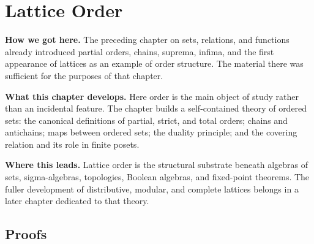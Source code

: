 \chapter{Lattice Order}


\begin{tcolorbox}[
  colback=gray!6,
  colframe=gray!40,
  arc=2pt,
  left=8pt, right=8pt, top=6pt, bottom=6pt,
  title={\small\textbf{Structural Roadmap}},
  fonttitle=\small\bfseries
]
\noindent\textbf{How we got here.}
The preceding chapter on sets, relations, and functions already introduced
partial orders, chains, suprema, infima, and the first appearance of
lattices as an example of order structure.  The material there was sufficient
for the purposes of that chapter.

\medskip
\noindent\textbf{What this chapter develops.}
Here order is the main object of study rather than an incidental feature.
The chapter builds a self-contained theory of ordered sets: the canonical
definitions of partial, strict, and total orders; chains and antichains;
maps between ordered sets; the duality principle; and the covering relation
and its role in finite posets.

\medskip
\noindent\textbf{Where this leads.}
Lattice order is the structural substrate beneath algebras of sets,
sigma-algebras, topologies, Boolean algebras, and fixed-point theorems.
The fuller development of distributive, modular, and complete lattices
belongs in a later chapter dedicated to that theory.
\end{tcolorbox}



\section*{Proofs}
